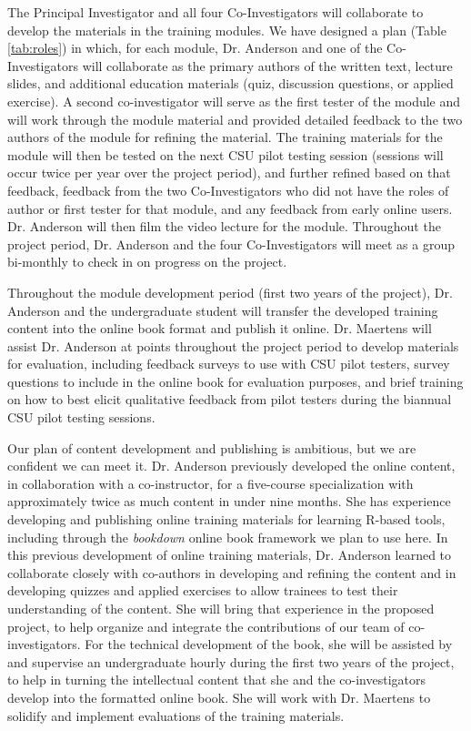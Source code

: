 \documentclass[pdftex,english,11pt,parskip=half]{scrartcl}
\begin{document}
The Principal Investigator and all four Co-Investigators will collaborate to 
develop the materials in the training modules. We have designed a plan (Table \ref{tab:roles}) in which, for each module, Dr. Anderson and one of the Co-Investigators will collaborate as the primary authors of the written text, lecture slides, and additional education materials (quiz, discussion questions, or applied exercise). A second co-investigator will serve as the first tester of the module and will work through the module material and provided detailed feedback to the two authors of the module for refining the material. The training materials for the module will then be tested on the next CSU pilot testing session (sessions will occur twice per year over the project period), and further refined based on that feedback, feedback from the two Co-Investigators who did not have the roles of author or first tester for that module, and any feedback from early online users. Dr. Anderson will then film the video lecture for the module. Throughout the project period, Dr. Anderson and the four Co-Investigators will meet as a group bi-monthly to check in on progress on the project. 

Throughout the module development period (first two years of the project), Dr. Anderson and the undergraduate student will transfer the developed training content into the online book format and publish it online. Dr. Maertens will assist Dr. Anderson at points throughout the project period to develop materials for evaluation, including feedback surveys to use with CSU pilot testers, survey questions to include in the online book for evaluation purposes, and brief training on how to best elicit qualitative feedback from pilot testers during the biannual CSU pilot testing sessions.

Our plan of content development and publishing is ambitious, but we are
confident we can meet it. Dr. Anderson previously developed the online content,
in collaboration with a co-instructor, for a five-course specialization with
approximately twice as much content in under nine months. She has experience
developing and publishing online training materials for learning R-based tools,
including through the \textit{bookdown} online book framework we plan to use
here. In this previous development of online training materials, Dr. Anderson
learned to collaborate closely with co-authors in developing and refining the
content and in developing quizzes and applied exercises to allow trainees to
test their understanding of the content. She will bring that experience in the
proposed project, to help organize and integrate the contributions of our team
of co-investigators. For the technical development of the book, she will be
assisted by and supervise an undergraduate hourly during the first two years of
the project, to help in turning the intellectual content that she and the
co-investigators develop into the formatted online book. She will work with Dr.
Maertens to solidify and implement evaluations of the training materials.
\end{document}

